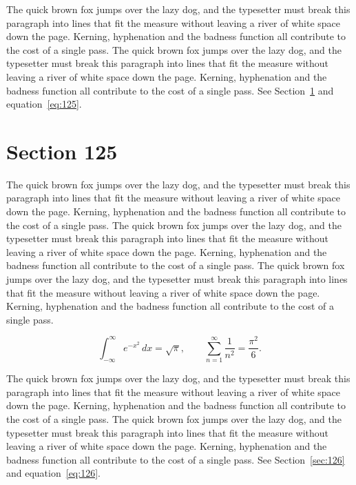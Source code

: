 \documentclass{article}
\begin{document}
The quick brown fox jumps over the lazy dog, and the typesetter must break this paragraph into lines that fit the measure without leaving a river of white space down the page. Kerning, hyphenation and the badness function all contribute to the cost of a single pass. The quick brown fox jumps over the lazy dog, and the typesetter must break this paragraph into lines that fit the measure without leaving a river of white space down the page. Kerning, hyphenation and the badness function all contribute to the cost of a single pass. 
See Section~\ref{sec:125} and equation~\eqref{eq:125}.
\section{Section 125}
\label{sec:125}
The quick brown fox jumps over the lazy dog, and the typesetter must break this paragraph into lines that fit the measure without leaving a river of white space down the page. Kerning, hyphenation and the badness function all contribute to the cost of a single pass. The quick brown fox jumps over the lazy dog, and the typesetter must break this paragraph into lines that fit the measure without leaving a river of white space down the page. Kerning, hyphenation and the badness function all contribute to the cost of a single pass. The quick brown fox jumps over the lazy dog, and the typesetter must break this paragraph into lines that fit the measure without leaving a river of white space down the page. Kerning, hyphenation and the badness function all contribute to the cost of a single pass. 

\begin{equation}\label{eq:125}
\int_{-\infty}^{\infty} e^{-x^{2}}\,dx = \sqrt{\pi}, \qquad
\sum_{n=1}^{\infty} \frac{1}{n^{2}} = \frac{\pi^{2}}{6}.
\end{equation}

The quick brown fox jumps over the lazy dog, and the typesetter must break this paragraph into lines that fit the measure without leaving a river of white space down the page. Kerning, hyphenation and the badness function all contribute to the cost of a single pass. The quick brown fox jumps over the lazy dog, and the typesetter must break this paragraph into lines that fit the measure without leaving a river of white space down the page. Kerning, hyphenation and the badness function all contribute to the cost of a single pass. 
See Section~\ref{sec:126} and equation~\eqref{eq:126}.
\end{document}
